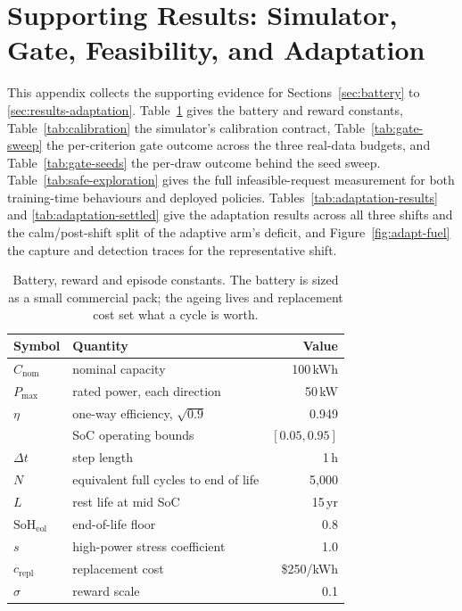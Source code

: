 \documentclass[conference]{IEEEtran}
\begin{document}
\appendices

\onecolumn

\clearpage
\section{Supporting Results: Simulator, Gate, Feasibility, and Adaptation}
\label{app:supporting-market}

This appendix collects the supporting evidence for Sections~\ref{sec:battery} to \ref{sec:results-adaptation}. Table~\ref{tab:params} gives the battery and reward constants, Table~\ref{tab:calibration} the simulator's calibration contract, Table~\ref{tab:gate-sweep} the per-criterion gate outcome across the three real-data budgets, and Table~\ref{tab:gate-seeds} the per-draw outcome behind the seed sweep. Table~\ref{tab:safe-exploration} gives the full infeasible-request measurement for both training-time behaviours and deployed policies. Tables~\ref{tab:adaptation-results} and \ref{tab:adaptation-settled} give the adaptation results across all three shifts and the calm/post-shift split of the adaptive arm's deficit, and Figure~\ref{fig:adapt-fuel} the capture and detection traces for the representative shift.

\begin{table}[htbp]
\centering
\caption{Battery, reward and episode constants. The battery is sized as a small commercial pack; the ageing lives and replacement cost set what a cycle is worth.}
\label{tab:params}
\small
\begin{tabular}{llr}
\toprule
Symbol & Quantity & Value \\
\midrule
$C_{\mathrm{nom}}$ & nominal capacity & 100\,kWh \\
$P_{\max}$ & rated power, each direction & 50\,kW \\
$\eta$ & one-way efficiency, $\sqrt{0.9}$ & 0.949 \\
& SoC operating bounds & $[0.05, 0.95]$ \\
$\Delta t$ & step length & 1\,h \\
$N$ & equivalent full cycles to end of life & 5{,}000 \\
$L$ & rest life at mid SoC & 15\,yr \\
$\mathrm{SoH}_{\mathrm{eol}}$ & end-of-life floor & 0.8 \\
$s$ & high-power stress coefficient & 1.0 \\
$c_{\mathrm{repl}}$ & replacement cost & \$250/kWh \\
$\sigma$ & reward scale & 0.1 \\
\bottomrule
\end{tabular}
\end{table}
\end{document}
